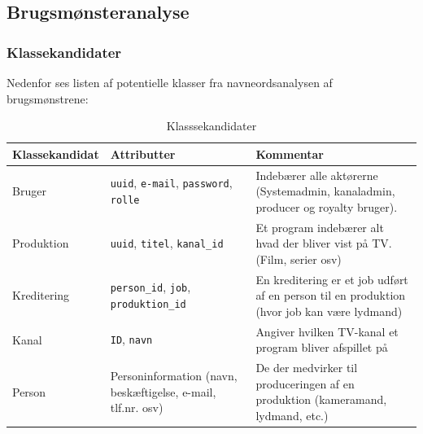 \subsection{Brugsmønsteranalyse}

\subsubsection{Klassekandidater}
Nedenfor ses listen af potentielle klasser fra navneordsanalysen af brugsmønstrene:
\begin{table}[ht]
    \begin{tabularx}{\textwidth}{|p{4cm}|p{4cm}|X|}
        \hline
        \textbf{Klassekandidat} & \textbf{Attributter} & \textbf{Kommentar} \\
        \hline
        Bruger      & \texttt{uuid}, \texttt{e-mail}, \texttt{password}, \texttt{rolle} & Indebærer alle aktørerne (Systemadmin, kanaladmin, producer og royalty bruger).\\
        \hline
        Produktion  & \texttt{uuid}, \texttt{titel}, \texttt{kanal\_id} & Et program indebærer alt hvad der bliver vist på TV. (Film, serier osv) \\
        \hline
        Kreditering & \texttt{person\_id}, \texttt{job}, \texttt{produktion\_id} & En kreditering er et job udført af en person til en produktion (hvor job kan være lydmand) \\
        \hline
        Kanal & \texttt{ID}, \texttt{navn} & Angiver hvilken TV-kanal et program bliver afspillet på \\
        \hline
        Person & Personinformation (navn, beskæftigelse, e-mail, tlf.nr. osv)  & De der medvirker til produceringen af en produktion (kameramand, lydmand, etc.)\\
        \hline
    \end{tabularx}
    \caption{Klasssekandidater}
    \label{table:class_candidates}
\end{table}

